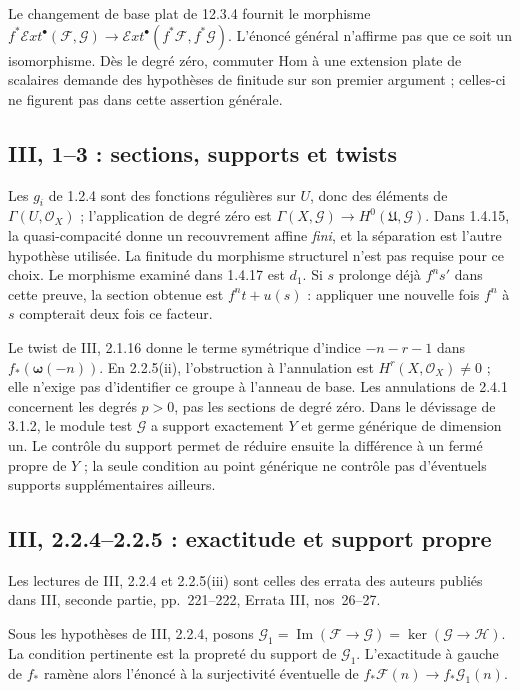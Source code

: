 \documentclass[11pt,a4paper]{article}
\begin{document}
Le changement de base plat de 12.3.4 fournit le morphisme
$f^*\mathcal E\!xt^\bullet(\mathcal F,\mathcal G)
\to\mathcal E\!xt^\bullet(f^*\mathcal F,f^*\mathcal G)$.
L'énoncé général n'affirme pas que ce soit un isomorphisme.
Dès le degré zéro, commuter Hom à une extension plate de
scalaires demande des hypothèses de finitude sur son premier
argument ; celles-ci ne figurent pas dans cette assertion générale.

\subsection{III, 1--3 : sections, supports et twists}
\label{note:base3-sections}
Les $g_i$ de 1.2.4 sont des fonctions régulières sur $U$,
donc des éléments de $\Gamma(U,\mathcal O_X)$ ; l'application
de degré zéro est $\Gamma(X,\mathcal G)\to H^0(\mathfrak U,\mathcal G)$.
Dans 1.4.15, la quasi-compacité donne un recouvrement affine
\emph{fini}, et la séparation est l'autre hypothèse utilisée.
La finitude du morphisme structurel n'est pas requise pour ce choix.
Le morphisme examiné dans 1.4.17 est $d_1$.
Si $s$ prolonge déjà $f^ns'$ dans cette preuve, la section
obtenue est $f^nt+u(s)$ : appliquer une nouvelle fois $f^n$
à $s$ compterait deux fois ce facteur.

Le twist de III, 2.1.16 donne le terme symétrique d'indice
$-n-r-1$ dans $f_*(\boldsymbol\omega(-n))$.
En 2.2.5(ii), l'obstruction à l'annulation est
$H^r(X,\mathcal O_X)\ne0$ ; elle n'exige pas d'identifier
ce groupe à l'anneau de base. Les annulations de 2.4.1
concernent les degrés $p>0$, pas les sections de degré zéro.
Dans le dévissage de 3.1.2, le module test $\mathcal G$ a
support exactement $Y$ et germe générique de dimension un.
Le contrôle du support permet de réduire ensuite la différence
à un fermé propre de $Y$ ; la seule condition au point générique
ne contrôle pas d'éventuels supports supplémentaires ailleurs.

\subsection{III, 2.2.4--2.2.5 : exactitude et support propre}
\label{note:base3-propersupport}
Les lectures de III, 2.2.4 et 2.2.5(iii) sont celles des
errata des auteurs publiés dans III, seconde partie, pp.~221--222,
Errata III, nos~26--27.

Sous les hypothèses de III, 2.2.4, posons
$\mathcal G_1=\operatorname{Im}(\mathcal F\to\mathcal G)
=\ker(\mathcal G\to\mathcal H)$.
La condition pertinente est la propreté du support de
$\mathcal G_1$. L'exactitude à gauche de $f_*$ ramène alors
l'énoncé à la surjectivité éventuelle de
$f_*\mathcal F(n)\to f_*\mathcal G_1(n)$.
\end{document}
